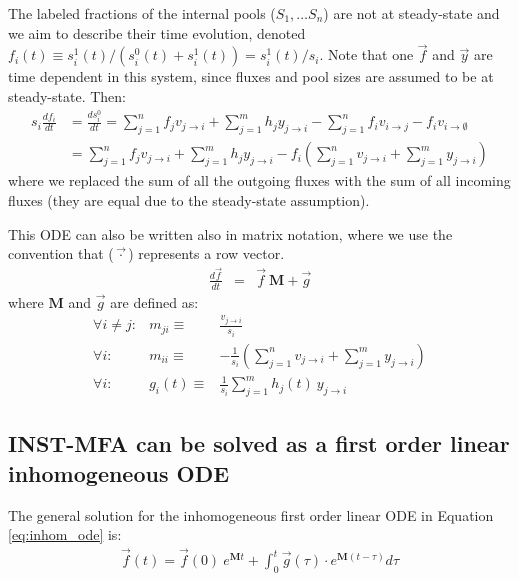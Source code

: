 \documentclass{article}
\newcommand{\flux}[2]{\ensuremath{v_{{#1} \rightarrow {#2}}}}
\begin{document}
The labeled fractions of the internal pools ($S_1, \ldots S_n$) are not at steady-state and we aim to describe their time evolution, denoted $f_i(t) \equiv s_i^1(t) / (s_i^0(t) + s_i^1(t)) = s_i^1(t) / s_i$. Note that one $\vec{f}$ and $\vec{y}$ are time dependent in this system, since fluxes and pool sizes are assumed to be at steady-state. Then:
\begin{align}
    s_i \frac{d f_i}{dt} 
    &= \frac{d s_i^0}{dt}
    = \sum_{j=1}^{n} f_j\flux{j}{i} + \sum_{j=1}^m h_j y_{j \rightarrow i} - \sum_{j=1}^n f_i \flux{i}{j} - f_i \flux{i}{\emptyset}\nonumber\\
    &= \sum_{j=1}^{n} f_j\flux{j}{i} + \sum_{j=1}^m h_j y_{j \rightarrow i} - f_i \left( \sum_{j=1}^n \flux{j}{i} + \sum_{j=1}^m y_{j \rightarrow i}\right) \label{eq:steady_state}
\end{align}
where we replaced the sum of all the outgoing fluxes with the sum of all incoming fluxes (they are equal due to the steady-state assumption).

This ODE can also be written also in matrix notation, where we use the convention that ($\vec{\cdot}$) represents a row vector.
\begin{eqnarray}\label{eq:inhom_ode}
	\frac{d\vec{f}}{dt} &=& \vec{f}~\mathbf{M} + \vec{g}
\end{eqnarray}
where $\mathbf{M}$ and $\vec{g}$ are defined as:
\begin{eqnarray}
    \forall i \neq j:& m_{ji} \equiv& \frac{\flux{j}{i}}{s_i} \\
    \forall i:& m_{ii} \equiv& -\frac{1}{s_i} \left(\sum_{j=1}^n \flux{j}{i} + \sum_{j=1}^m y_{j \rightarrow i} \right)\\
    \forall i:& g_{i}(t) \equiv& \frac{1}{s_i} \sum_{j=1}^m h_j(t)~y_{j \rightarrow i}
\end{eqnarray}

\subsection{INST-MFA can be solved as a first order linear inhomogeneous ODE}
The general solution \cite{young_elementary_2008} for the inhomogeneous first order linear ODE in Equation \ref{eq:inhom_ode} is:
\begin{eqnarray}\label{eq:inhom_ode_sol}
    \vec{f}(t) = \vec{f}(0)~e^{\mathbf{M} t} + \int_0^t \vec{g}(\tau) \cdot e^{\mathbf{M} (t-\tau)} d\tau
\end{eqnarray}
\end{document}
